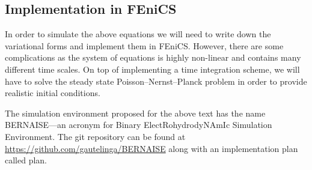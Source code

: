 \documentclass[a4paper,10pt]{article}
\numberwithin{equation}{section}
\numberwithin{figure}{section}
\begin{document}
\subsection*{Implementation in FEniCS}
In order to simulate the above equations we will need to write down the variational forms and implement them in FEniCS.
However, there are some complications as the system of equations is highly non-linear and contains many different time scales.
On top of implementing a time integration scheme, we will have to solve the steady state Poisson--Nernst--Planck problem in order to provide realistic initial conditions.

The simulation environment proposed for the above text has the name BERNAISE---an acronym for Binary ElectRohydrodyNAmIc Simulation Environment.
The git repository can be found at \url{https://github.com/gautelinga/BERNAISE} along with an implementation plan called plan.
\end{document}
